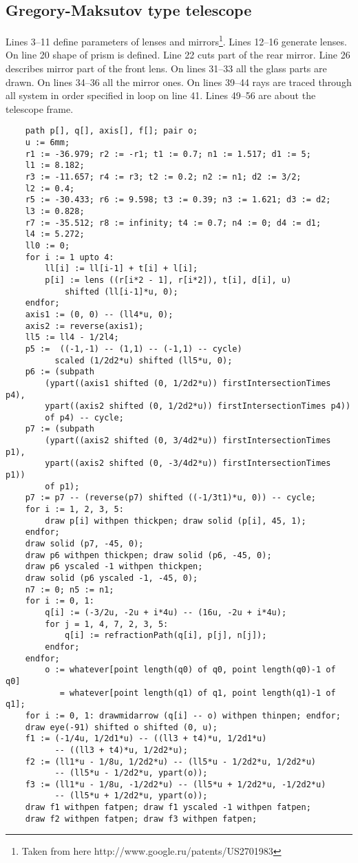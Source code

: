 \documentclass{article}
\begin{document}
\subsection{Gregory-Maksutov type telescope}
Lines 3--11 define parameters of lenses and mirrors\footnote{Taken from here http://www.google.ru/patents/US2701983}. Lines 12--16 generate lenses. On line 20 shape of prism is defined. Line 22 cuts part of the rear mirror. Line 26 describes mirror part of the front lens. On lines 31--33 all the glass parts are drawn. On lines 34--36 all the mirror ones. On lines 39--44 rays are traced through all system in order specified in loop on line 41. Lines 49--56 are about the telescope frame.
\begin{lstlisting}
    path p[], q[], axis[], f[]; pair o;
    u := 6mm;
    r1 := -36.979; r2 := -r1; t1 := 0.7; n1 := 1.517; d1 := 5;
    l1 := 8.182;
    r3 := -11.657; r4 := r3; t2 := 0.2; n2 := n1; d2 := 3/2;
    l2 := 0.4;
    r5 := -30.433; r6 := 9.598; t3 := 0.39; n3 := 1.621; d3 := d2;
    l3 := 0.828;
    r7 := -35.512; r8 := infinity; t4 := 0.7; n4 := 0; d4 := d1;
    l4 := 5.272;
    ll0 := 0;
    for i := 1 upto 4:
    	ll[i] := ll[i-1] + t[i] + l[i];
    	p[i] := lens ((r[i*2 - 1], r[i*2]), t[i], d[i], u) 
	        shifted (ll[i-1]*u, 0);
    endfor;
    axis1 := (0, 0) -- (ll4*u, 0);
    axis2 := reverse(axis1);
    ll5 := ll4 - 1/2l4;
    p5 :=  ((-1,-1) -- (1,1) -- (-1,1) -- cycle)
          scaled (1/2d2*u) shifted (ll5*u, 0);
    p6 := (subpath 
        (ypart((axis1 shifted (0, 1/2d2*u)) firstIntersectionTimes p4), 
        ypart((axis2 shifted (0, 1/2d2*u)) firstIntersectionTimes p4))
        of p4) -- cycle;
    p7 := (subpath 
        (ypart((axis2 shifted (0, 3/4d2*u)) firstIntersectionTimes p1), 
        ypart((axis2 shifted (0, -3/4d2*u)) firstIntersectionTimes p1))
        of p1);
    p7 := p7 -- (reverse(p7) shifted ((-1/3t1)*u, 0)) -- cycle;
    for i := 1, 2, 3, 5: 
        draw p[i] withpen thickpen; draw solid (p[i], 45, 1); 
    endfor;
    draw solid (p7, -45, 0);
    draw p6 withpen thickpen; draw solid (p6, -45, 0);
    draw p6 yscaled -1 withpen thickpen;
    draw solid (p6 yscaled -1, -45, 0);
    n7 := 0; n5 := n1;
    for i := 0, 1:
        q[i] := (-3/2u, -2u + i*4u) -- (16u, -2u + i*4u);
        for j = 1, 4, 7, 2, 3, 5: 
            q[i] := refractionPath(q[i], p[j], n[j]);
        endfor;
    endfor;
        o := whatever[point length(q0) of q0, point length(q0)-1 of q0] 
           = whatever[point length(q1) of q1, point length(q1)-1 of q1];
    for i := 0, 1: drawmidarrow (q[i] -- o) withpen thinpen; endfor;
    draw eye(-91) shifted o shifted (0, u);
    f1 := (-1/4u, 1/2d1*u) -- ((ll3 + t4)*u, 1/2d1*u)
          -- ((ll3 + t4)*u, 1/2d2*u);
    f2 := (ll1*u - 1/8u, 1/2d2*u) -- (ll5*u - 1/2d2*u, 1/2d2*u)
          -- (ll5*u - 1/2d2*u, ypart(o));
    f3 := (ll1*u - 1/8u, -1/2d2*u) -- (ll5*u + 1/2d2*u, -1/2d2*u)
          -- (ll5*u + 1/2d2*u, ypart(o));
    draw f1 withpen fatpen; draw f1 yscaled -1 withpen fatpen;
    draw f2 withpen fatpen; draw f3 withpen fatpen;
\end{lstlisting}
\end{document}
